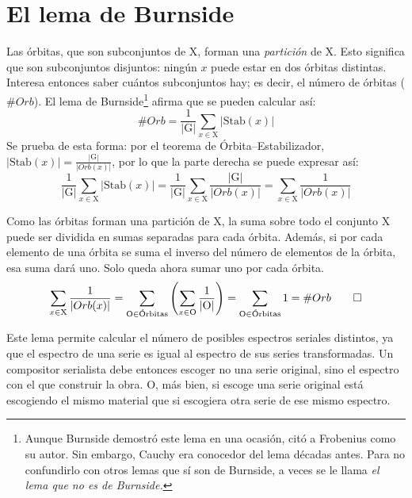 	\section{El lema de Burnside}
		\label{burnside}
		Las órbitas, que son subconjuntos de X, forman una \emph{partición} de X. Esto significa que son subconjuntos disjuntos: ningún $x$ puede estar en dos órbitas distintas. Interesa entonces saber cuántos subconjuntos hay; es decir, el número de órbitas ($\#Orb$). El lema de Burnside\footnote{Aunque Burnside demostró este lema en una ocasión, citó a Frobenius como su autor. Sin embargo, Cauchy era conocedor del lema décadas antes. Para no confundirlo con otros lemas que sí son de Burnside, a veces se le llama \emph{el lema que no es de Burnside.}} afirma que se pueden calcular así:
		\[\#Orb=\frac{1}{|\text{G}|}\sum_{x\in\text{X}}|\text{Stab}(x)|\]	
		Se prueba de esta forma: por el teorema de Órbita--Estabilizador, $|\text{Stab}(x)|=\frac{|\text{G}|}{|Orb(x)|}$, por lo que la parte derecha se puede expresar así:
		\[\frac{1}{|\text{G}|}\sum_{x\in\text{X}}|\text{Stab}(x)|=
		\frac{1}{|\text{G}|}\sum_{x\in\text{X}}\frac{|\text{G}|}{|Orb(x)|}=
		\sum_{x\in\text{X}}\frac{1}{|Orb(x)|}\]

		Como las órbitas forman una partición de X, la suma sobre todo el conjunto X puede ser dividida en sumas separadas para cada órbita. Además, si por cada elemento de una órbita se suma el inverso del número de elementos de la órbita, esa suma dará uno. Solo queda ahora sumar uno por cada órbita.
		\[\sum_{x\in\text{X}}\frac{1}{|Orb(x)|}=\sum_{\text{O}\in\text{Órbitas}}\left(\sum_{x\in\text{O}}\frac{1}{|\text{O}|}\right)=\sum_{\text{O}\in\text{Órbitas}}1=\#Orb \qed\]	
	
		Este lema permite calcular el número de posibles espectros seriales distintos, ya que el espectro de una serie es igual al espectro de sus series transformadas. Un compositor serialista debe entonces escoger no una serie original, sino el espectro con el que construir la obra. O, más bien, si escoge una serie original está escogiendo el mismo material que si escogiera otra serie de ese mismo espectro.